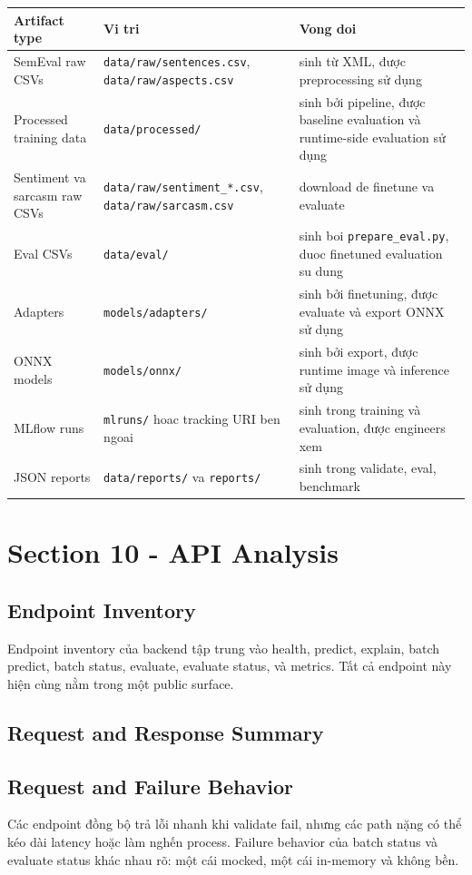 \begin{table}[H]
\centering
\begin{tabularx}{\textwidth}{@{}l l X@{}}
\toprule
\textbf{Artifact type} & \textbf{Vi tri} & \textbf{Vong doi} \\
\midrule
SemEval raw CSVs & \texttt{data/raw/sentences.csv}, \texttt{data/raw/aspects.csv} & sinh từ XML, được preprocessing sử dụng \\
Processed training data & \texttt{data/processed/} & sinh bởi pipeline, được baseline evaluation và runtime-side evaluation sử dụng \\
Sentiment va sarcasm raw CSVs & \texttt{data/raw/sentiment\_*.csv}, \texttt{data/raw/sarcasm.csv} & download de finetune va evaluate \\
Eval CSVs & \texttt{data/eval/} & sinh boi \texttt{prepare\_eval.py}, duoc finetuned evaluation su dung \\
Adapters & \texttt{models/adapters/} & sinh bởi finetuning, được evaluate và export ONNX sử dụng \\
ONNX models & \texttt{models/onnx/} & sinh bởi export, được runtime image và inference sử dụng \\
MLflow runs & \texttt{mlruns/} hoac tracking URI ben ngoai & sinh trong training và evaluation, được engineers xem \\
JSON reports & \texttt{data/reports/} va \texttt{reports/} & sinh trong validate, eval, benchmark \\
\bottomrule
\end{tabularx}
\end{table}

\section{Section 10 - API Analysis}
\subsection{Endpoint Inventory}
Endpoint inventory của backend tập trung vào health, predict, explain, batch predict, batch status, evaluate, evaluate status, và metrics. Tất cả endpoint này hiện cùng nằm trong một public surface.

\subsection{Request and Response Summary}
\subsection{Request and Failure Behavior}
Các endpoint đồng bộ trả lỗi nhanh khi validate fail, nhưng các path nặng có thể kéo dài latency hoặc làm nghến process. Failure behavior của batch status và evaluate status khác nhau rõ: một cái mocked, một cái in-memory và không bền.

